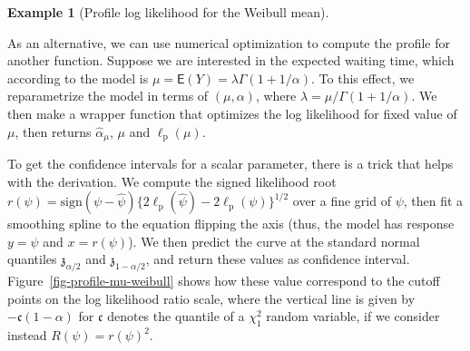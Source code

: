\documentclass[
  11pt,
  letterpaper,
]{scrbook}
\theoremstyle{plain}
\theoremstyle{definition}
\newtheorem{example}{Example}[chapter]
\theoremstyle{definition}
\theoremstyle{plain}
\theoremstyle{remark}
\begin{document}
\begin{example}[Profile log likelihood for the Weibull
mean]\protect\hypertarget{exm-profile-mean-weibull}{}\label{exm-profile-mean-weibull}

As an alternative, we can use numerical optimization to compute the
profile for another function. Suppose we are interested in the expected
waiting time, which according to the model is
\(\mu = \mathsf{E}(Y) = \lambda\Gamma(1+1/\alpha)\). To this effect, we
reparametrize the model in terms of \((\mu, \alpha)\), where
\(\lambda=\mu/\Gamma(1+1/\alpha)\). We then make a wrapper function that
optimizes the log likelihood for fixed value of \(\mu\), then returns
\(\widehat{\alpha}_{\mu}\), \(\mu\) and \(\ell_{\mathrm{p}}(\mu)\).

To get the confidence intervals for a scalar parameter, there is a trick
that helps with the derivation. We compute the signed likelihood root
\(r(\psi) = \mathrm{sign}(\psi - \widehat{\psi})\{2\ell_{\mathrm{p}}(\widehat{\psi}) -2 \ell_{\mathrm{p}}(\psi)\}^{1/2}\)
over a fine grid of \(\psi\), then fit a smoothing spline to the
equation flipping the axis (thus, the model has response \(y=\psi\) and
\(x=r(\psi)\)). We then predict the curve at the standard normal
quantiles \(\mathfrak{z}_{\alpha/2}\) and \(\mathfrak{z}_{1-\alpha/2}\),
and return these values as confidence interval.
Figure~\ref{fig-profile-mu-weibull} shows how these value correspond to
the cutoff points on the log likelihood ratio scale, where the vertical
line is given by \(-\mathfrak{c}(1-\alpha)\) for \(\mathfrak{c}\)
denotes the quantile of a \(\chi^2_1\) random variable, if we consider
instead \(R(\psi) = r(\psi)^2\).


\end{example}
\end{document}
